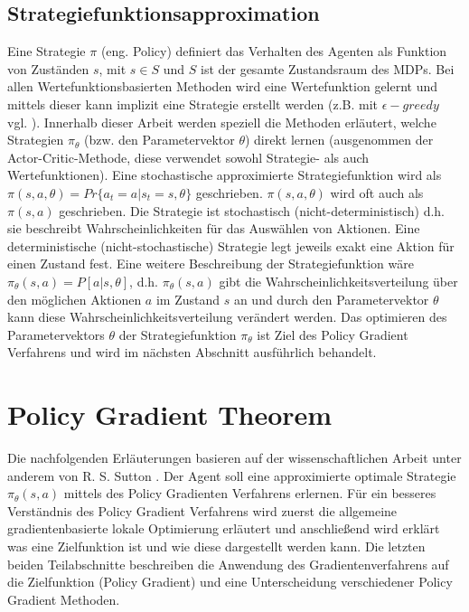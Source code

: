\documentclass[conference]{IEEEtran}
\begin{document}
\subsection{Strategiefunktionsapproximation}
Eine Strategie $\pi$ (eng. Policy) definiert das Verhalten des Agenten als Funktion von Zuständen $s$, mit $s \in S$ und $S$ ist der gesamte Zustandsraum des MDPs. Bei allen Wertefunktionsbasierten Methoden wird eine Wertefunktion gelernt und mittels dieser kann implizit eine Strategie erstellt werden (z.B. mit $\epsilon-greedy$ vgl. \cite{silver_15}). Innerhalb dieser Arbeit werden speziell die Methoden erläutert, welche Strategien $\pi_\theta$ (bzw. den Parametervektor $\theta$) direkt lernen (ausgenommen der Actor-Critic-Methode, diese verwendet sowohl Strategie- als auch Wertefunktionen). Eine stochastische approximierte Strategiefunktion wird als $\pi(s,a,\theta) = Pr \{ a_t = a | s_t = s, \theta \}$ geschrieben. $\pi(s,a,\theta)$ wird oft auch als $\pi(s,a)$ geschrieben. Die Strategie ist stochastisch (nicht-deterministisch) d.h. sie beschreibt Wahrscheinlichkeiten für das Auswählen von Aktionen. Eine deterministische (nicht-stochastische) Strategie legt jeweils exakt eine Aktion für einen Zustand fest. Eine weitere Beschreibung der Strategiefunktion wäre $\pi_\theta (s,a) = P[a|s,\theta]$, d.h. $\pi_\theta (s,a)$ gibt die Wahrscheinlichkeitsverteilung über den möglichen Aktionen $a$ im Zustand $s$ an und durch den Parametervektor $\theta$ kann diese Wahrscheinlichkeitsverteilung verändert werden. Das optimieren des Parametervektors $\theta$ der Strategiefunktion $\pi_\theta$ ist Ziel des Policy Gradient Verfahrens und wird im nächsten Abschnitt ausführlich behandelt. 

\section{Policy Gradient Theorem}
Die nachfolgenden Erläuterungen basieren auf der wissenschaftlichen Arbeit unter anderem von R. S. Sutton \cite{sutton_99}. Der Agent soll eine approximierte optimale Strategie $\pi_\theta (s, a)$ mittels des Policy Gradienten Verfahrens erlernen. Für ein besseres Verständnis des Policy Gradient Verfahrens wird zuerst die allgemeine gradientenbasierte lokale Optimierung erläutert und anschließend wird erklärt was eine Zielfunktion ist und wie diese dargestellt werden kann. Die letzten beiden  Teilabschnitte beschreiben die Anwendung des Gradientenverfahrens auf die Zielfunktion (Policy Gradient) und eine Unterscheidung verschiedener Policy Gradient Methoden.
\end{document}
